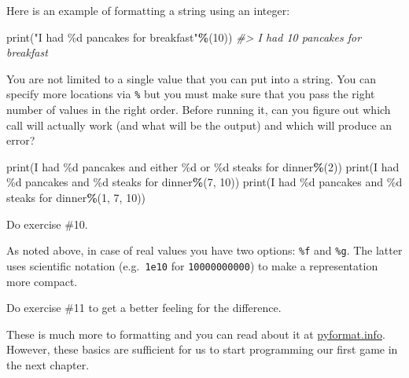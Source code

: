 \documentclass[
]{book}
\newenvironment{Shaded}{\begin{snugshade}}{\end{snugshade}}
\newcommand{\BuiltInTok}[1]{#1}
\newcommand{\CommentTok}[1]{\textcolor[rgb]{0.56,0.35,0.01}{\textit{#1}}}
\newcommand{\DecValTok}[1]{\textcolor[rgb]{0.00,0.00,0.81}{#1}}
\newcommand{\NormalTok}[1]{#1}
\newcommand{\OperatorTok}[1]{\textcolor[rgb]{0.81,0.36,0.00}{\textbf{#1}}}
\newcommand{\SpecialCharTok}[1]{\textcolor[rgb]{0.00,0.00,0.00}{#1}}
\newcommand{\StringTok}[1]{\textcolor[rgb]{0.31,0.60,0.02}{#1}}
\begin{document}
Here is an example of formatting a string using an integer:

\begin{Shaded}
\begin{Highlighting}[]
\BuiltInTok{print}\NormalTok{(}\StringTok{"I had }\SpecialCharTok{\%d}\StringTok{ pancakes for breakfast"}\OperatorTok{\%}\NormalTok{(}\DecValTok{10}\NormalTok{))}
\CommentTok{\#\textgreater{} I had 10 pancakes for breakfast}
\end{Highlighting}
\end{Shaded}

You are not limited to a single value that you can put into a string. You can specify more locations via \texttt{\%} but you must make sure that you pass the right number of values in the right order. Before running it, can you figure out which call will actually work (and what will be the output) and which will produce an error?

\begin{Shaded}
\begin{Highlighting}[]
\BuiltInTok{print}\NormalTok{(}\StringTok{\textquotesingle{}I had }\SpecialCharTok{\%d}\StringTok{ pancakes and either }\SpecialCharTok{\%d}\StringTok{  or }\SpecialCharTok{\%d}\StringTok{ steaks for dinner\textquotesingle{}}\OperatorTok{\%}\NormalTok{(}\DecValTok{2}\NormalTok{))}
\BuiltInTok{print}\NormalTok{(}\StringTok{\textquotesingle{}I had }\SpecialCharTok{\%d}\StringTok{ pancakes and }\SpecialCharTok{\%d}\StringTok{ steaks for dinner\textquotesingle{}}\OperatorTok{\%}\NormalTok{(}\DecValTok{7}\NormalTok{, }\DecValTok{10}\NormalTok{))}
\BuiltInTok{print}\NormalTok{(}\StringTok{\textquotesingle{}I had }\SpecialCharTok{\%d}\StringTok{ pancakes and }\SpecialCharTok{\%d}\StringTok{ steaks for dinner\textquotesingle{}}\OperatorTok{\%}\NormalTok{(}\DecValTok{1}\NormalTok{, }\DecValTok{7}\NormalTok{, }\DecValTok{10}\NormalTok{))}
\end{Highlighting}
\end{Shaded}

Do exercise \#10.

As noted above, in case of real values you have two options: \texttt{\%f} and \texttt{\%g}. The latter uses scientific notation (e.g.~\texttt{1e10} for \texttt{10000000000}) to make a representation more compact.

Do exercise \#11 to get a better feeling for the difference.

These is much more to formatting and you can read about it at \href{https://pyformat.info/}{pyformat.info}. However, these basics are sufficient for us to start programming our first game in the next chapter.
\end{document}

